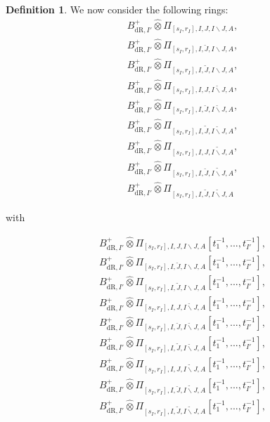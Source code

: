 \documentclass[12pt]{amsart}
\theoremstyle{definition}
\newtheorem{definition}[theorem]{Definition}
\numberwithin{equation}{section}
\begin{document}
\begin{definition}
We now consider the following rings:
\begin{align}
B^+_{\mathrm{dR},I'}	\widehat{\otimes}\Pi_{[s_I,r_I],I,J,I\backslash J,A},\\	
B^+_{\mathrm{dR},I'}	\widehat{\otimes}\Pi_{[s_I,r_I],I,\breve{J},I\backslash J,A},\\	
B^+_{\mathrm{dR},I'}	\widehat{\otimes}\Pi_{[s_I,r_I],I,\widetilde{J},I\backslash J,A},\\
B^+_{\mathrm{dR},I'}	\widehat{\otimes}\Pi_{[s_I,r_I],I,J,\breve{I\backslash J},A},\\	
B^+_{\mathrm{dR},I'}	\widehat{\otimes}\Pi_{[s_I,r_I],I,\breve{J},\breve{I\backslash J},A},\\
B^+_{\mathrm{dR},I'}	\widehat{\otimes}\Pi_{[s_I,r_I],I,\widetilde{J},\breve{I\backslash J},A},\\
B^+_{\mathrm{dR},I'}	\widehat{\otimes}\Pi_{[s_I,r_I],I,J,\widetilde{I\backslash J},A},\\	
B^+_{\mathrm{dR},I'}	\widehat{\otimes}\Pi_{[s_I,r_I],I,\breve{J},\widetilde{I\backslash J},A},\\
B^+_{\mathrm{dR},I'}	\widehat{\otimes}\Pi_{[s_I,r_I],I,\widetilde{J},\widetilde{I\backslash J},A}
\end{align}

with

\begin{align}
B^+_{\mathrm{dR},I'}	\widehat{\otimes}\Pi_{[s_I,r_I],I,J,I\backslash J,A}[t_1^{-1},...,t_{I'}^{-1}],\\	
B^+_{\mathrm{dR},I'}	\widehat{\otimes}\Pi_{[s_I,r_I],I,\breve{J},I\backslash J,A}[t_1^{-1},...,t_{I'}^{-1}],\\	
B^+_{\mathrm{dR},I'}	\widehat{\otimes}\Pi_{[s_I,r_I],I,\widetilde{J},I\backslash J,A}[t_1^{-1},...,t_{I'}^{-1}],\\
B^+_{\mathrm{dR},I'}	\widehat{\otimes}\Pi_{[s_I,r_I],I,J,\breve{I\backslash J},A}[t_1^{-1},...,t_{I'}^{-1}],\\	
B^+_{\mathrm{dR},I'}	\widehat{\otimes}\Pi_{[s_I,r_I],I,\breve{J},\breve{I\backslash J},A}[t_1^{-1},...,t_{I'}^{-1}],\\
B^+_{\mathrm{dR},I'}	\widehat{\otimes}\Pi_{[s_I,r_I],I,\widetilde{J},\breve{I\backslash J},A}[t_1^{-1},...,t_{I'}^{-1}],\\
B^+_{\mathrm{dR},I'}	\widehat{\otimes}\Pi_{[s_I,r_I],I,J,\widetilde{I\backslash J},A}[t_1^{-1},...,t_{I'}^{-1}],\\	
B^+_{\mathrm{dR},I'}	\widehat{\otimes}\Pi_{[s_I,r_I],I,\breve{J},\widetilde{I\backslash J},A}[t_1^{-1},...,t_{I'}^{-1}],\\
B^+_{\mathrm{dR},I'}	\widehat{\otimes}\Pi_{[s_I,r_I],I,\widetilde{J},\widetilde{I\backslash J},A}[t_1^{-1},...,t_{I'}^{-1}],
\end{align}


\end{definition}
\end{document}
